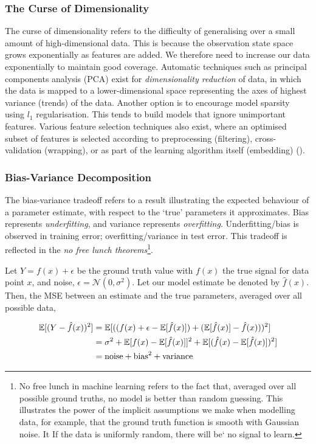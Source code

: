\documentclass[11pt]{amsart}
\begin{document}
\subsubsection{The Curse of Dimensionality}
The curse of dimensionality refers to the difficulty of generalising over a small amount of high-dimensional data. This is because the observation state space grows exponentially as features are added. We therefore need to increase our data exponentially to maintain good coverage. Automatic techniques such as principal components analysis (PCA) exist for \emph{dimensionality reduction} of data, in which the data is mapped to a lower-dimensional space representing the axes of highest variance (trends) of the data. Another option is to encourage model sparsity using $l_1$ regularisation. This tends to build models that ignore unimportant features. Various 
feature selection techniques also exist, where an optimised subset of features is selected according to preprocessing (filtering), cross-validation (wrapping), or as part of the learning algorithm itself (embedding) (\cite{transfersurvey}).

\subsubsection{Bias-Variance Decomposition}
The bias-variance tradeoff refers to a result illustrating the expected behaviour of a parameter estimate, with respect to the `true' parameters it approximates. Bias represents \emph{underfitting}, and variance represents \emph{overfitting}. Underfitting/bias is observed in training error; overfitting/variance in test error. This tradeoff is reflected in the \emph{no free lunch theorems}\footnote{No free lunch in machine learning refers to the fact that, averaged over all possible ground truths, no model is better than random guessing. This illustrates the power of the implicit assumptions we make when modelling data, for example, that the ground truth function is smooth with Gaussian noise. It  If the data is uniformly random, there will be` no signal to learn.}.

 Let $Y = f(x) + \epsilon$ be the ground truth value with $f(x)$ the true signal for data point $x$, and noise, $\epsilon = \mathcal{N}(0, \sigma^2)$. Let our model estimate be denoted by $\hat{f}(x)$. Then, the MSE between an estimate and the true parameters, averaged over all possible data,

\begin{align}
\mathbb{E}[(Y - \hat{f}(x))^2] &= \mathbb{E}[((f(x) + \epsilon - \mathbb{E}[\hat{f}(x)]) + (\mathbb{E}[\hat{f}(x)] - \hat{f}(x)))^2] \notag \\
&= \sigma^2 + \mathbb{E}[f(x) - \mathbb{E}[\hat{f}(x)]]^2 + \mathbb{E}[(\hat{f}(x) - \mathbb{E}[\hat{f}(x)])^2] \notag \\
&= \text{noise} + \text{bias}^2 + \text{variance} \notag
\end{align}
\end{document}
